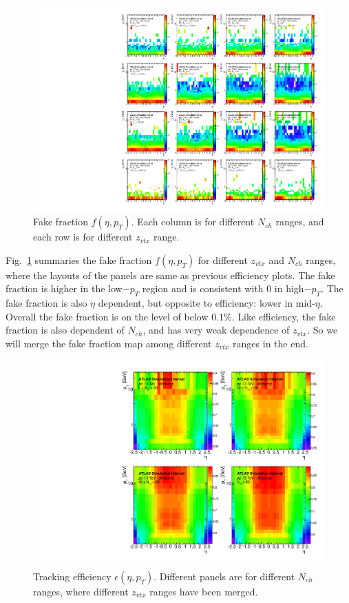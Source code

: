 \begin{figure}[H]
\centering
\includegraphics[width=1.\linewidth]{figs/sec_evtSlc/trkEff_pp13_fak_2D_wZvtx.pdf}
\caption{Fake fraction $f(\eta,p_{T})$. Each column is for different $N_{ch}$ ranges, and each row is for different $z_{vtx}$ range.}
\label{fig:trkEff_pp13_fak_2D_wZvtx}
\end{figure}

Fig.~\ref{fig:trkEff_pp13_fak_2D_wZvtx} summaries the fake fraction $f(\eta,p_{T})$ for different $z_{vtx}$ and $N_{ch}$ ranges, where the layouts of the panels are same as previous efficiency plots. The fake fraction is higher in the low$-p_{T}$ region and is consistent with 0 in high$-p_{T}$. The fake fraction is also $\eta$ dependent, but opposite to efficiency: lower in mid-$\eta$. Overall the fake fraction is on the level of below $0.1\%$. Like efficiency, the fake fraction is also dependent of $N_{ch}$, and has very weak dependence of $z_{vtx}$. So we will merge the fake fraction map among different $z_{vtx}$ ranges in the end.

\begin{figure}[H]
\centering
\includegraphics[width=1.\linewidth]{figs/sec_evtSlc/trkEff_pp13_eff_2D.pdf}
\caption{Tracking efficiency $\epsilon(\eta,p_{T})$. Different panels are for different $N_{ch}$ ranges, where different $z_{vtx}$ ranges have been merged.}
\label{fig:trkEff_pp13_eff_2D}
\end{figure}

